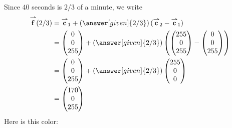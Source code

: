 \documentclass{ximera}
\begin{document}
\begin{example}
\begin{explanation}
\[    \]
    Since $40$ seconds is $2/3$ of a minute, we write
    \begin{align*}
      \vec{f}(2/3) &= \vec{c}_{1}+ \left(\answer[given]{2/3}\right)(\vec{c}_2 -\vec{c}_1) \\
      &= \begin{pmatrix}0\\0\\255\end{pmatrix}+ \left(\answer[given]{2/3}\right)\left(\begin{pmatrix}255\\0\\255\end{pmatrix}  -  \begin{pmatrix}0\\0\\255\end{pmatrix}\right) \\
      &=\begin{pmatrix}0\\0\\255\end{pmatrix}+ \left(\answer[given]{2/3}\right)\begin{pmatrix}255\\0\\0\end{pmatrix} \\
                &=\begin{pmatrix}170\\0\\255\end{pmatrix}
    \end{align*}
    Here is this color:
  \begin{center}
    \colorbox[rgb]{0.67,0,1}{%
      \parbox{1cm}{\rule{0pt}{1cm}}}
  \end{center}
  \end{explanation}
\end{example}
\end{document}
